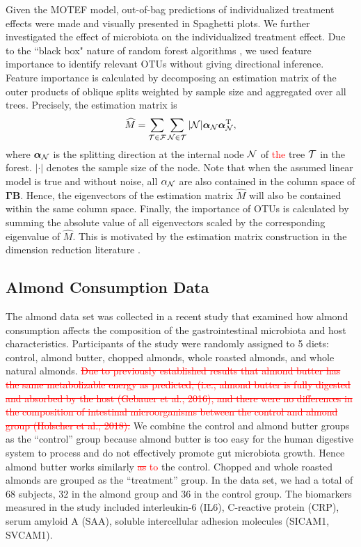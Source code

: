 \documentclass[smallextended]{svjour3}
\newcommand{\trnp}{^\text{T}}
\newcommand{\bg}[1]{\textcolor{red}{#1}}
\begin{document}
Given the MOTEF model, out-of-bag predictions of individualized treatment effects were made and visually presented in Spaghetti plots. We further investigated the effect of microbiota on the individualized treatment effect. Due to the ``black box" nature of random forest algorithms \citep{breiman2001statistical}, we used feature importance to identify relevant OTUs without giving directional inference. Feature importance is calculated by decomposing an estimation matrix of the outer products of oblique splits weighted by sample size and aggregated over all trees. Precisely, the estimation matrix is
\begin{equation*}
    \widehat{M} = \sum\limits_{{\cal T} \in {\cal F}} \sum\limits_{{\cal N} \in {\cal T}}|{\cal N}|\bm \alpha_{\cal N} \bm\alpha_{\cal N}\trnp,
\end{equation*}
where $\bm \alpha_{\cal N}$ is the splitting direction at the internal node ${\cal N}$ of \bg{the} tree ${\cal T}$ in the forest. $|\cdot|$ denotes the sample size of the node. Note that when the assumed linear model is true and without noise, all $\alpha_{\cal N}$ are also contained in the column space of $\bm \Gamma \bm B$. Hence, the eigenvectors of the estimation matrix $\widehat{M}$ will also be contained within the same column space. Finally, the importance of OTUs is calculated by summing the absolute value of all eigenvectors scaled by the corresponding eigenvalue of $\widehat{M}$. This is motivated by the estimation matrix construction in the dimension reduction literature \citep{li1991sliced}.

\subsection{Almond Consumption Data}
The almond data set was collected in a recent study \citep{holscher2018almond} that examined how almond consumption affects the composition of the gastrointestinal microbiota and host characteristics. Participants of the study were randomly assigned to 5 diets: control, almond butter, chopped almonds, whole roasted almonds, and whole natural almonds. \bg{\st{Due to previously established results that almond butter has the same metabolizable energy as predicted, (i.e., almond butter is fully digested and absorbed by the host (Gebauer et al., 2016), and there were no differences in the composition of intestinal microorganisms between the control and almond group (Holscher et al., 2018).}} We combine the control and almond butter groups as the ``control'' group because almond butter is too easy for the human digestive system to process and do not effectively promote gut microbiota growth. Hence almond butter works similarly \bg{\st{as} to} the control. Chopped and whole roasted almonds are grouped as the ``treatment'' group. In the data set, we had a total of 68 subjects, 32 in the almond group and 36 in the control group. The biomarkers measured in the study included interleukin-6 (IL6), C-reactive protein (CRP), serum amyloid A (SAA), soluble intercellular adhesion molecules (SICAM1, SVCAM1).
\end{document}
